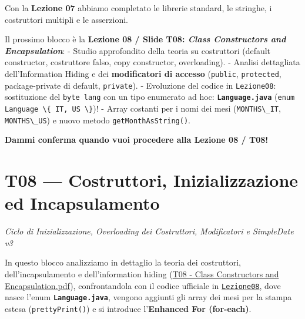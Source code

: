 \documentclass[11pt,a4paper,oneside]{report}
\newcommand{\passthrough}[1]{#1}
\begin{document}
\begin{studynote} Con la \textbf{Lezione 07} abbiamo completato le librerie
standard, le stringhe, i costruttori multipli e le asserzioni.

Il prossimo blocco è la \textbf{Lezione 08 / Slide T08: \emph{Class
Constructors and Encapsulation}}: - Studio approfondito della teoria su
costruttori (default constructor, costruttore falso, copy constructor,
overloading). - Analisi dettagliata dell'Information Hiding e dei
\textbf{modificatori di accesso} (\passthrough{\lstinline!public!},
\passthrough{\lstinline!protected!}, package-private di default,
\passthrough{\lstinline!private!}). - Evoluzione del codice in
\passthrough{\lstinline!Lezione08!}: sostituzione del
\passthrough{\lstinline!byte lang!} con un tipo enumerato ad hoc:
\textbf{\passthrough{\lstinline!Language.java!}}
(\passthrough{\lstinline!enum Language \{ IT, US \}!})! - Array costanti
per i nomi dei mesi (\passthrough{\lstinline!MONTHS\_IT!},
\passthrough{\lstinline!MONTHS\_US!}) e nuovo metodo
\passthrough{\lstinline!getMonthAsString()!}.
\end{studynote}

\textbf{Dammi conferma quando vuoi procedere alla Lezione 08 / T08!}

\newpage
\chapter[T08 --- Costruttori, Inizializzazione ed In]{T08 --- Costruttori, Inizializzazione ed Incapsulamento}
\label{chap:t08}

{\small\sffamily\color{accentblue!80!black}\textit{Ciclo di Inizializzazione, Overloading dei Costruttori, Modificatori e SimpleDate v3}}

\vspace{0.8em}

In questo blocco analizziamo in dettaglio la teoria dei costruttori,
dell'incapsulamento e dell'information hiding
(\href{file:///home/wally/Documenti/GitHub/Programmazione-II/25-26/Teoria-e-Esercitazioni/Slides-20260902/T08\%20-\%20Class\%20Constructors\%20and\%20Encapsulation.pdf}{T08
- Class Constructors and Encapsulation.pdf}), confrontandola con il
codice ufficiale in
\href{file:///home/wally/Documenti/GitHub/Programmazione-II/25-26/Teoria-e-Esercitazioni/Codice-20260902/Lezione08/SimpleDate/src}{\passthrough{\lstinline!Lezione08!}},
dove nasce l'enum \textbf{\passthrough{\lstinline!Language.java!}},
vengono aggiunti gli array dei mesi per la stampa estesa
(\passthrough{\lstinline!prettyPrint()!}) e si introduce
l'\textbf{Enhanced For (for-each)}.
\end{document}
